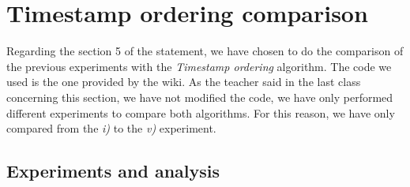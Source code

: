 \documentclass[a4paper, 10pt]{article}
\begin{document}
\section{Timestamp ordering comparison}

Regarding the section 5 of the statement, we have chosen to do the comparison of the previous experiments with the \textit{Timestamp ordering} algorithm. The code we used is the one provided by the wiki. As the teacher said in the last class concerning this section, we have not modified the code, we have only performed different experiments to compare both algorithms. For this reason, we have only compared from the \textit{i)} to the \textit{v)} experiment.

\subsection{Experiments and analysis}
\end{document}
